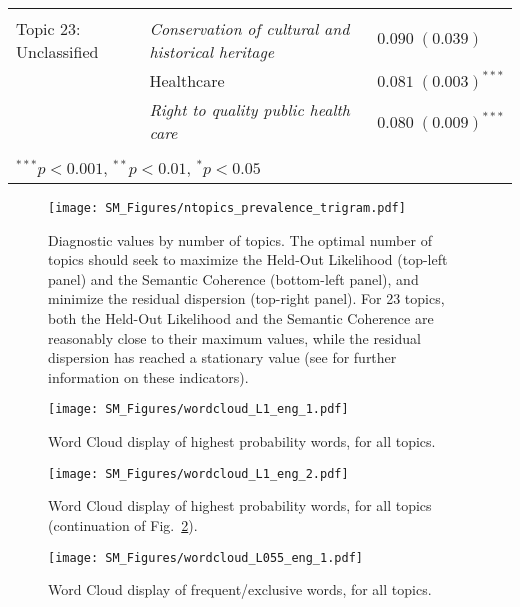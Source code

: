 \documentclass[onecolumn]{article}
\begin{document}
\begin{table}
\begin{center}
\begin{tabular}{l l l }
\hline \\[-1.8ex]
Topic 23: Unclassified & \textit{Conservation of cultural and historical heritage} & $0.090 \; (0.039)$       \\
& Healthcare                                       & $0.081 \; (0.003)^{***}$ \\
& \textit{Right to quality public health care}              & $0.080 \; (0.009)^{***}$ \\
\hline \\[-1.8ex] 
\multicolumn{3}{l}{\scriptsize{$^{***}p<0.001$, $^{**}p<0.01$, $^*p<0.05$}}
\end{tabular}
\end{center}
\end{table}



\begin{figure}[!h]
\centering
\texttt{[image: SM\_Figures/ntopics\_prevalence\_trigram.pdf]}
\caption{Diagnostic values by number of topics. The optimal number of topics should seek to maximize the Held-Out Likelihood (top-left panel) and the Semantic Coherence (bottom-left panel), and minimize the residual dispersion (top-right panel). For 23 topics, both the Held-Out Likelihood and the Semantic Coherence are reasonably close to their maximum values, while  the residual dispersion has reached a stationary value (see \cite{wallach2009,taddy2012,mimno2011} for further information on these indicators).}
\label{fig:ntopic}
\end{figure}


\begin{figure}[!h]
\centering
\texttt{[image: SM\_Figures/wordcloud\_L1\_eng\_1.pdf]}
\caption{Word Cloud display of highest probability words, for all topics.}
\label{fig:wordcloud1}
\end{figure}

\begin{figure}[!h]
\centering
\texttt{[image: SM\_Figures/wordcloud\_L1\_eng\_2.pdf]}
\caption*{Word Cloud display of highest probability words, for all topics (continuation of Fig.~\ref{fig:wordcloud1}).}
\end{figure}

\begin{figure}[!h]
\centering
\texttt{[image: SM\_Figures/wordcloud\_L055\_eng\_1.pdf]}
\caption{Word Cloud display of frequent/exclusive words, for all topics.}
\label{fig:wordcloud055}
\end{figure}
\end{document}
